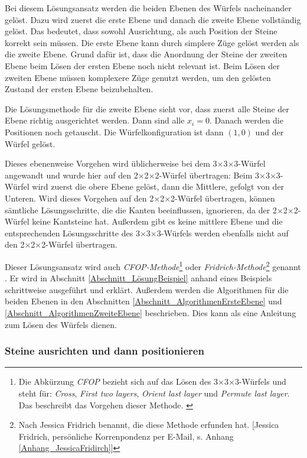 \documentclass[12pt,a4paper, usenames, dvipsnames]{article}
\theoremstyle{mystyle}
\theoremstyle{definition}
\newcommand{\Ttwo}{2$\times$2$\times$2-}
\newcommand{\Tthree}{3$\times$3$\times$3-}
\begin{document}
Bei diesem Lösungsansatz werden die beiden Ebenen des Würfels nacheinander gelöst. Dazu wird zuerst die erste Ebene und danach die zweite Ebene vollständig gelöst. Das bedeutet, dass sowohl Ausrichtung, als auch Position der Steine korrekt sein müssen. Die erste Ebene kann durch simplere Züge gelöst werden als die zweite Ebene. Grund dafür ist, dass die Anordnung der Steine der zweiten Ebene beim Lösen der ersten Ebene noch nicht relevant ist. Beim Lösen der zweiten Ebene müssen komplexere Züge genutzt werden, um den gelösten Zustand der ersten Ebene beizubehalten. 

Die Lösungsmethode für die zweite Ebene sieht vor, dass zuerst alle Steine der Ebene richtig ausgerichtet werden. Dann sind alle $x_i=0$. Danach werden die Positionen noch getauscht. Die Würfelkonfiguration ist dann $(1,0)$ und der Würfel gelöst.

Dieses ebenenweise Vorgehen wird üblicherweise bei dem \Tthree Würfel angewandt und wurde hier auf den \Ttwo Würfel übertragen: Beim \Tthree Würfel wird zuerst die obere Ebene gelöst, dann die Mittlere, gefolgt von der Unteren. Wird dieses Vorgehen auf den \Ttwo Würfel übertragen, können sämtliche Lösungsschritte, die die Kanten beeinflussen, ignorieren, da der \Ttwo Würfel keine Kantsteine hat. Außerdem gibt es keine mittlere Ebene und die entsprechenden Lösungsschritte des \Tthree Würfels werden ebenfalls nicht auf den \Ttwo Würfel übertragen.

Dieser Lösungsansatz wird auch \textit{CFOP-Methode}\footnote{Die Abkürzung \textit{CFOP} bezieht sich auf das Lösen des \Tthree Würfels und steht für: \textit{Cross}, \textit{First two layers}, \textit{Orient last layer} und \textit{Permute last layer}. Das beschreibt das Vorgehen dieser Methode. \cite{DDJT}} oder \textit{Fridrich-Methode}\footnote{Nach Jessica Fridrich benannt, die diese Methode erfunden hat. $[$Jessica Fridrich, persönliche Korrenpondenz per E-Mail, s. Anhang \ref{Anhang_JessicaFridirch}$]$} genannt \cite{DDJT}.
Er wird in Abschnitt \ref{Abschnitt_LösungBeispiel} anhand eines Beispiels schrittweise ausgeführt und erklärt. Außerdem werden die Algorithmen für die beiden Ebenen in den Abschnitten \ref{Abschnitt_AlgorithmenErsteEbene} und \ref{Abschnitt_AlgorithmenZweiteEbene} beschrieben. Dies kann als eine Anleitung zum Lösen des Würfels dienen.

\subsubsection*{Steine ausrichten und dann positionieren}
\end{document}

